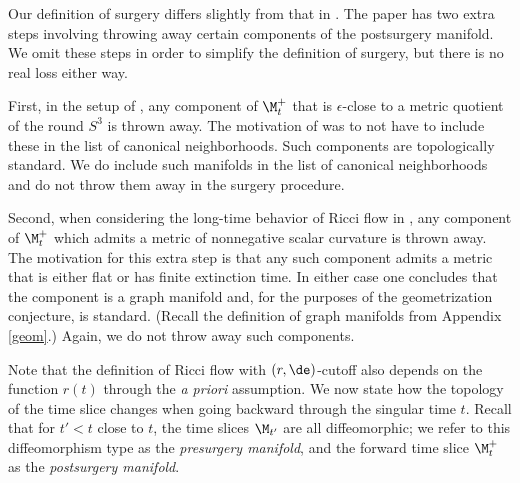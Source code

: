 \begin{remark}
  \label{rem:kl-performing-surgery-continuing-flows-existence-canonical-neighborhoods}

Our definition of surgery differs slightly from that in
\cite{Perelman2}. The paper \cite{Perelman2} has two
extra steps involving throwing away certain components
of the postsurgery manifold.
We omit these steps in order to simplify the definition of
surgery, but there is no real loss either way.

First, in the setup of \cite[Section 4.4]{Perelman2},
any component of $\M_{t}^+$ that is $\epsilon$-close
to a metric quotient of the round $S^3$ is thrown away. The
motivation of \cite{Perelman2} was to not have to include
these in the list of canonical neighborhoods. Such
components
are topologically standard.  We do include such manifolds
in the list of canonical neighborhoods and do not
throw them away in the surgery procedure.

Second,
when considering the long-time behavior of Ricci flow
in \cite[Section 7]{Perelman2},
any component of $\M_{t}^+$ which admits a
metric of nonnegative scalar curvature is thrown away.
The motivation for this extra step is that any such
component admits a metric that is either flat or has
finite extinction time.  In either case one concludes that
the component is a graph manifold and, for the purposes
of the geometrization conjecture, is standard.
(Recall the definition of graph manifolds from
Appendix \ref{geom}.)
Again, we do not throw away such components.
\end{remark}


Note that the definition of Ricci flow with $(r, \de)$-cutoff also depends
on the function $r(t)$ through the {\it a priori} assumption. We now state
how the topology of the time slice changes when going backward through the
singular time  $t$.  Recall that for $t'<t$ close to $t$, the time slices
$\M_{t'}$ are all diffeomorphic; we refer to this diffeomorphism type
as the {\em presurgery manifold}, and the forward time slice
$\M_t^+$ as the {\em postsurgery manifold}.

